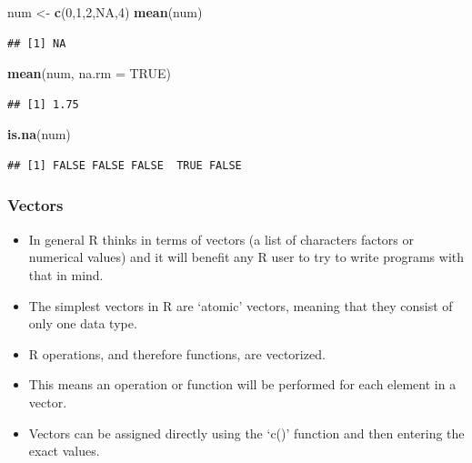 \documentclass[]{book}
\newenvironment{Shaded}{\begin{snugshade}}{\end{snugshade}}
\newcommand{\DataTypeTok}[1]{\textcolor[rgb]{0.13,0.29,0.53}{#1}}
\newcommand{\DecValTok}[1]{\textcolor[rgb]{0.00,0.00,0.81}{#1}}
\newcommand{\KeywordTok}[1]{\textcolor[rgb]{0.13,0.29,0.53}{\textbf{#1}}}
\newcommand{\NormalTok}[1]{#1}
\newcommand{\OtherTok}[1]{\textcolor[rgb]{0.56,0.35,0.01}{#1}}
\newcommand{\StringTok}[1]{\textcolor[rgb]{0.31,0.60,0.02}{#1}}
\begin{document}
\begin{Shaded}
\begin{Highlighting}[]
\NormalTok{num <-}\StringTok{ }\KeywordTok{c}\NormalTok{(}\DecValTok{0}\NormalTok{,}\DecValTok{1}\NormalTok{,}\DecValTok{2}\NormalTok{,}\OtherTok{NA}\NormalTok{,}\DecValTok{4}\NormalTok{)}
\KeywordTok{mean}\NormalTok{(num)}
\end{Highlighting}
\end{Shaded}

\begin{verbatim}
## [1] NA
\end{verbatim}

\begin{Shaded}
\begin{Highlighting}[]
\KeywordTok{mean}\NormalTok{(num, }\DataTypeTok{na.rm =} \OtherTok{TRUE}\NormalTok{)}
\end{Highlighting}
\end{Shaded}

\begin{verbatim}
## [1] 1.75
\end{verbatim}

\begin{Shaded}
\begin{Highlighting}[]
\KeywordTok{is.na}\NormalTok{(num)}
\end{Highlighting}
\end{Shaded}

\begin{verbatim}
## [1] FALSE FALSE FALSE  TRUE FALSE
\end{verbatim}

\hypertarget{vectors}{%
\subsubsection{Vectors}\label{vectors}}

\begin{itemize}
\item
  In general R thinks in terms of vectors (a list of characters factors or numerical values) and it will benefit any R user to try to write programs with that in mind.
\item
  The simplest vectors in R are `atomic' vectors, meaning that they consist of only one data type.
\item
  R operations, and therefore functions, are vectorized.
\item
  This means an operation or function will be performed for each element in a vector.
\item
  Vectors can be assigned directly using the `c()' function and then entering the exact values.
\end{itemize}
\end{document}
